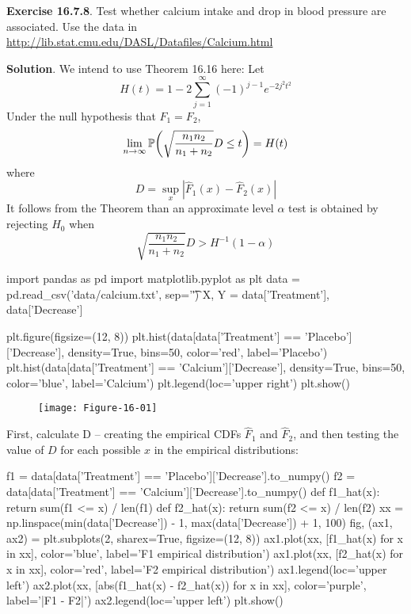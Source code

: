 \textbf{Exercise 16.7.8}. Test whether calcium intake and drop in blood
pressure are associated. Use the data in
\url{http://lib.stat.cmu.edu/DASL/Datafiles/Calcium.html}

\textbf{Solution}.
We intend to use Theorem 16.16 here:
Let
\[
H(t) = 1 - 2 \sum_{j=1}^{\infty} (-1)^{j-1} e^{-2j^{2}t^{2}}
\]
Under the null hypothesis that \(F_{1} = F_{2}\),
\[
\lim_{n \rightarrow \infty} \PROB \left( \sqrt{\frac{n_{1} n_{2}}{n_{1} + n_{2}}} D \leq t \right) = H(t)
\]
where
\[
D = \sup_x | \hat{F}_{1}(x) - \hat{F}_{2}(x) |
\]
It follows from the Theorem than an approximate level \(\alpha\) test is
obtained by rejecting \(H_{0}\) when
\[
\sqrt{\frac{n_{1} n_{2}}{n_{1} + n_{2}}} D > H^{-1}(1 - \alpha)
\]

\begin{python}
import pandas as pd
import matplotlib.pyplot as plt
data = pd.read_csv('data/calcium.txt', sep='\t')
X, Y = data['Treatment'], data['Decrease']
\end{python}

\begin{python}
plt.figure(figsize=(12, 8))
plt.hist(data[data['Treatment'] == 'Placebo']['Decrease'], 
         density=True, bins=50, color='red', label='Placebo')
plt.hist(data[data['Treatment'] == 'Calcium']['Decrease'], 
         density=True, bins=50, color='blue', label='Calcium')
plt.legend(loc='upper right')
plt.show()
\end{python}

\begin{figure}[H]
\centering
\texttt{[image: Figure-16-01]}
\end{figure}

First,  calculate D -- creating the empirical CDFs \(\hat{F}_{1}\)
and \(\hat{F}_{2}\), and then testing the value of \(D\) for each possible
\(x\) in the empirical distributions:

\begin{python}
f1 = data[data['Treatment'] == 'Placebo']['Decrease'].to_numpy()
f2 = data[data['Treatment'] == 'Calcium']['Decrease'].to_numpy()
def f1_hat(x):
    return sum(f1 <= x) / len(f1)
def f2_hat(x):
    return sum(f2 <= x) / len(f2)
xx = np.linspace(min(data['Decrease']) - 1, max(data['Decrease']) + 1, 100)
fig, (ax1, ax2) = plt.subplots(2, sharex=True, figsize=(12, 8))
ax1.plot(xx, [f1_hat(x) for x in xx], color='blue', label='F1 empirical distribution')
ax1.plot(xx, [f2_hat(x) for x in xx], color='red', label='F2 empirical distribution')
ax1.legend(loc='upper left')
ax2.plot(xx, [abs(f1_hat(x) - f2_hat(x)) for x in xx], color='purple', label='|F1 - F2|')
ax2.legend(loc='upper left')
plt.show()
\end{python}

